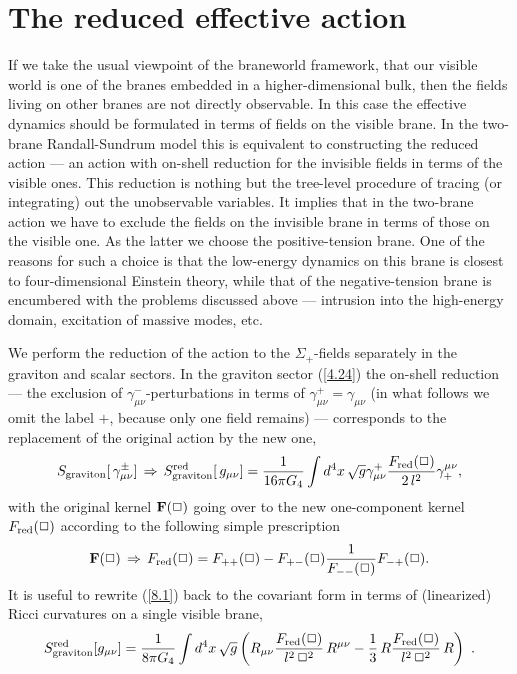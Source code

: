 \documentclass[a4paper,preprint,nofootinbib,
                 showpacs,preprintnumbers,amsmath,amssymb]{revtex4}
\begin{document}
 
 
\section{The reduced effective action\label{reduced}} 
If we take the usual viewpoint of the braneworld 
framework, that our visible world is one of the branes embedded in 
a higher-dimensional bulk, then the fields living on other branes 
are not directly observable. In this case the effective dynamics should be 
formulated in terms of fields on the visible brane. In the two-brane 
Randall-Sundrum model this is equivalent to constructing the reduced 
action --- an action with on-shell reduction for the invisible fields 
in terms of the visible ones. This reduction is nothing but the tree-level 
procedure of tracing (or integrating) out the unobservable variables. 
It implies that in the two-brane action we have to exclude the  
fields on the invisible brane in 
terms of those on the visible one. As the latter we choose the 
positive-tension brane. One of the reasons for such a choice is 
that the low-energy dynamics on this brane is closest to 
four-dimensional Einstein theory, while that of the 
negative-tension brane is encumbered with the problems discussed 
above --- intrusion into the high-energy domain, excitation of massive 
modes, etc. 
 
We perform the reduction of the action to the $\Sigma_+$-fields 
separately in the graviton and scalar sectors. In the graviton 
sector (\ref{4.24}) the on-shell reduction --- the exclusion of  
$\gamma^-_{\mu\nu}$-perturbations in terms of $\gamma_{\mu\nu}^+ 
=\gamma_{\mu\nu}$ (in what follows we omit the label $+$, because  
only one field remains) --- corresponds to the replacement of the  
original action by the new one, 
    \begin{eqnarray} 
    S_{\rm graviton}[\,\gamma^\pm_{\mu\nu}]\,\Rightarrow\, 
    S_{\rm graviton}^{\rm red}[\,g_{\mu\nu}] 
    =\frac1{16\pi G_4}\int 
    d^4x\,\sqrt g 
    \gamma_{\mu\nu}^+ 
    \frac{F_{\rm red}(\Box)}{2\,l^2} 
    \gamma^{\mu\nu}_+ ,                     \label{8.1} 
    \end{eqnarray} 
with the original kernel ${\bf F}(\Box)$ going over to the new  
one-component kernel $F_{\rm red}(\Box)$ according to the  
following simple prescription 
    \begin{eqnarray} 
    {\bf F}(\Box)\, \Rightarrow\, 
    F_{\rm red}(\Box)=F_{++}(\Box)- 
    F_{+-}(\Box)\frac1{F_{--}(\Box)}F_{-+}(\Box). \label{8.2} 
    \end{eqnarray} 
It is useful to rewrite (\ref{8.1}) back to the covariant form in 
terms of (linearized) Ricci curvatures on a single visible brane, 
    \begin{equation} 
    S_{\rm graviton}^{\rm red}[g_{\mu\nu}] 
    =\frac1{8\pi G_4}\int 
    d^4x\,\sqrt g\left(R_{\mu\nu} 
    \frac{F_{\rm red}(\Box)}{l^2\,\Box^2}\, 
    R^{\mu\nu} 
    -\frac13\,R\frac{F_{\rm red} 
    (\Box)}{l^2\,\Box^2}\,R\right)\ .           \label{8.3} 
    \end{equation} 
 
\end{document}
